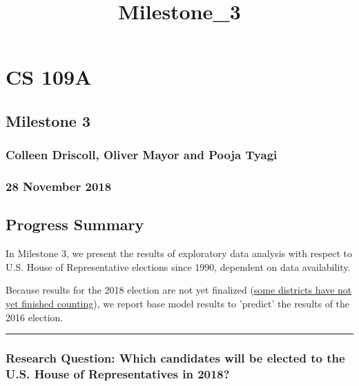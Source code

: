 \documentclass[11pt]{article}
\title{Milestone\_3}
\begin{document}
    
    
    \maketitle
    
    

    
    \section{CS 109A}\label{cs-109a}

\subsection{Milestone 3}\label{milestone-3}

\subsubsection{Colleen Driscoll, Oliver Mayor and Pooja
Tyagi}\label{colleen-driscoll-oliver-mayor-and-pooja-tyagi}

\subsubsection{28 November 2018}\label{november-2018}

    \subsection{Progress Summary}\label{progress-summary}

In Milestone 3, we present the results of exploratory data analysis with
respect to U.S. House of Representative elections since 1990, dependent
on data availability.

Because results for the 2018 election are not yet finalized
(\href{https://www.cnn.com/2018/11/28/politics/why-california-is-still-counting-ballots/index.html}{some
districts have not yet finished counting}), we report base model results
to 'predict' the results of the 2016 election.

\begin{center}\rule{0.5\linewidth}{\linethickness}\end{center}

\subsubsection{Research Question: Which candidates will be elected to
the U.S. House of Representatives in
2018?}\label{research-question-which-candidates-will-be-elected-to-the-u.s.-house-of-representatives-in-2018}
\end{document}
